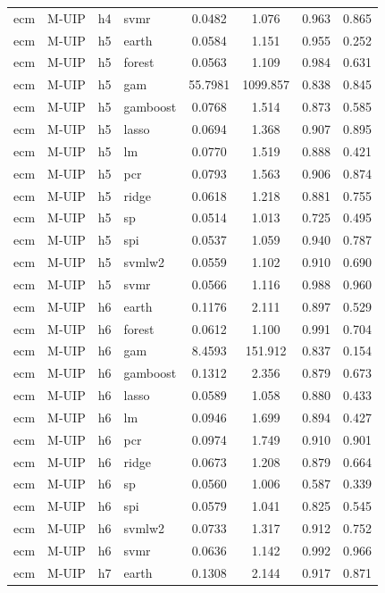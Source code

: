 \begin{ThreePartTable}
\begin{longtable}[t]{llclcccc}
ecm & M-UIP & h4 & svmr & 0.0482 & 1.076 & 0.963 & 0.865\\
\addlinespace
ecm & M-UIP & h5 & earth & 0.0584 & 1.151 & 0.955 & 0.252\\
ecm & M-UIP & h5 & forest & 0.0563 & 1.109 & 0.984 & 0.631\\
ecm & M-UIP & h5 & gam & 55.7981 & 1099.857 & 0.838 & 0.845\\
ecm & M-UIP & h5 & gamboost & 0.0768 & 1.514 & 0.873 & 0.585\\
ecm & M-UIP & h5 & lasso & 0.0694 & 1.368 & 0.907 & 0.895\\
ecm & M-UIP & h5 & lm & 0.0770 & 1.519 & 0.888 & 0.421\\
ecm & M-UIP & h5 & pcr & 0.0793 & 1.563 & 0.906 & 0.874\\
ecm & M-UIP & h5 & ridge & 0.0618 & 1.218 & 0.881 & 0.755\\
ecm & M-UIP & h5 & sp & 0.0514 & 1.013 & 0.725 & 0.495\\
ecm & M-UIP & h5 & spi & 0.0537 & 1.059 & 0.940 & 0.787\\
ecm & M-UIP & h5 & svmlw2 & 0.0559 & 1.102 & 0.910 & 0.690\\
ecm & M-UIP & h5 & svmr & 0.0566 & 1.116 & 0.988 & 0.960\\
\addlinespace
ecm & M-UIP & h6 & earth & 0.1176 & 2.111 & 0.897 & 0.529\\
ecm & M-UIP & h6 & forest & 0.0612 & 1.100 & 0.991 & 0.704\\
ecm & M-UIP & h6 & gam & 8.4593 & 151.912 & 0.837 & 0.154\\
ecm & M-UIP & h6 & gamboost & 0.1312 & 2.356 & 0.879 & 0.673\\
ecm & M-UIP & h6 & lasso & 0.0589 & 1.058 & 0.880 & 0.433\\
ecm & M-UIP & h6 & lm & 0.0946 & 1.699 & 0.894 & 0.427\\
ecm & M-UIP & h6 & pcr & 0.0974 & 1.749 & 0.910 & 0.901\\
ecm & M-UIP & h6 & ridge & 0.0673 & 1.208 & 0.879 & 0.664\\
ecm & M-UIP & h6 & sp & 0.0560 & 1.006 & 0.587 & 0.339\\
ecm & M-UIP & h6 & spi & 0.0579 & 1.041 & 0.825 & 0.545\\
ecm & M-UIP & h6 & svmlw2 & 0.0733 & 1.317 & 0.912 & 0.752\\
ecm & M-UIP & h6 & svmr & 0.0636 & 1.142 & 0.992 & 0.966\\
\addlinespace
ecm & M-UIP & h7 & earth & 0.1308 & 2.144 & 0.917 & 0.871\\

\end{longtable}
\end{ThreePartTable}
